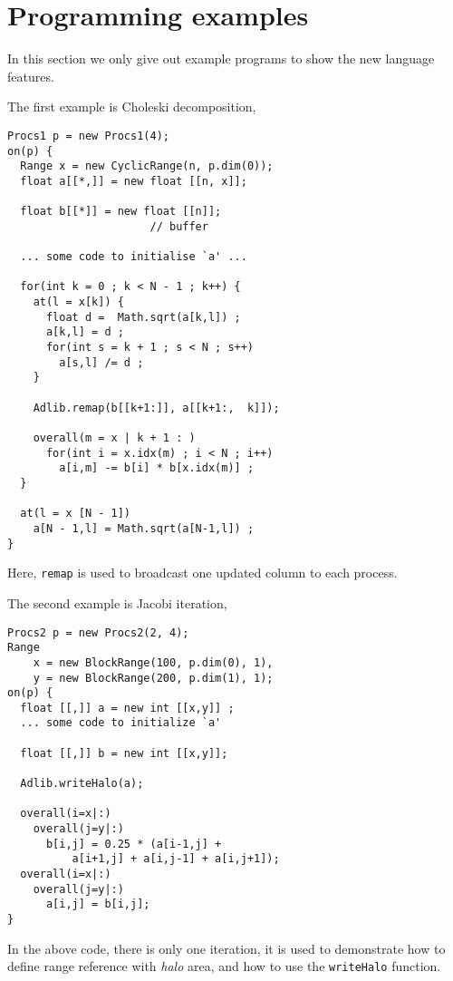\section{Programming examples}
\label{examples}

In this section we only give out example programs to show the new
language features.

The first example is Choleski decomposition,
\begin{small}
\begin{verbatim}
Procs1 p = new Procs1(4);
on(p) {
  Range x = new CyclicRange(n, p.dim(0));
  float a[[*,]] = new float [[n, x]];

  float b[[*]] = new float [[n]];
                      // buffer

  ... some code to initialise `a' ...

  for(int k = 0 ; k < N - 1 ; k++) {
    at(l = x[k]) {
      float d =  Math.sqrt(a[k,l]) ;
      a[k,l] = d ;
      for(int s = k + 1 ; s < N ; s++)
        a[s,l] /= d ;
    }

    Adlib.remap(b[[k+1:]], a[[k+1:,  k]]);

    overall(m = x | k + 1 : )
      for(int i = x.idx(m) ; i < N ; i++)
        a[i,m] -= b[i] * b[x.idx(m)] ;
  }

  at(l = x [N - 1])
    a[N - 1,l] = Math.sqrt(a[N-1,l]) ;
}
\end{verbatim}
\end{small}
Here, \texttt{remap} is used to broadcast one updated column to each
process.

The second example is Jacobi iteration,
\begin{small}
\begin{verbatim}
Procs2 p = new Procs2(2, 4);
Range
    x = new BlockRange(100, p.dim(0), 1),
    y = new BlockRange(200, p.dim(1), 1); 
on(p) {
  float [[,]] a = new int [[x,y]] ;
  ... some code to initialize `a'

  float [[,]] b = new int [[x,y]];

  Adlib.writeHalo(a);

  overall(i=x|:)
    overall(j=y|:)
      b[i,j] = 0.25 * (a[i-1,j] + 
          a[i+1,j] + a[i,j-1] + a[i,j+1]);
  overall(i=x|:)
    overall(j=y|:)
      a[i,j] = b[i,j];
}
\end{verbatim}
\end{small}
In the above code, there is only one iteration, it is used to demonstrate
how to define range reference with \emph{halo} area, and how to use
the \texttt{writeHalo} function. 

